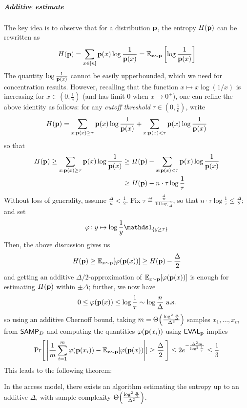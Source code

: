 \subparagraph{Additive estimate}
The key idea is to observe that for a distribution $\mathbf{p}$, the entropy $H(\mathbf{p})$ can be rewritten as
\begin{equation}
  H(\mathbf{p}) = \sum_{x\in[n]} \mathbf{p}(x)\log\frac{1}{\mathbf{p}(x)} = \mathbb{E}_{x\sim \mathbf{p}}\left[ \log\frac{1}{\mathbf{p}(x)} \right]
\end{equation}
The quantity $\log\frac{1}{\mathbf{p}(x)}$ cannot be easily upperbounded, which we need  for concentration results. However, recalling that the function {$x\mapsto x\log(1/x)$} is increasing for $x\in(0,\frac{1}{e})$ (and has limit 0 when $x\to 0^+$), one can refine the above identity as follows: for any \emph{cutoff threshold} $\tau \in(0,\frac{1}{e})$, write 
\begin{equation}
  H(\mathbf{p}) = \sum_{x:\mathbf{p}(x) \geq \tau} \mathbf{p}(x)\log\frac{1}{\mathbf{p}(x)} + \sum_{x:\mathbf{p}(x) < \tau} \mathbf{p}(x)\log\frac{1}{\mathbf{p}(x)} 
\end{equation}
so that
\begin{align*}
  H(\mathbf{p}) \geq \sum_{x:\mathbf{p}(x) \geq \tau} \mathbf{p}(x)\log\frac{1}{\mathbf{p}(x)} &\geq H(\mathbf{p}) - \sum_{x:\mathbf{p}(x) < \tau} \mathbf{p}(x)\log\frac{1}{\mathbf{p}(x)}  \\
  &\geq H(\mathbf{p}) - n\cdot\tau\log\frac{1}{\tau}
\end{align*}
Without loss of generality, assume $\frac{\Delta}{n} < \frac{1}{2}$. Fix $\tau\eqdef\frac{\frac{\Delta}{n}}{10\log \frac{n}{\Delta}}$, so that $n\cdot\tau\log\frac{1}{\tau}\leq \frac{\Delta}{2}$; and set 
\[
  \varphi\colon y \mapsto \log\frac{1}{y}\indic{y \geq \tau}
\]
Then, the above discussion gives us
\begin{equation}
  H(\mathbf{p}) \geq \mathbb{E}_{x\sim \mathbf{p}}[ \varphi(\mathbf{p}(x)) ] \geq H(\mathbf{p}) - \frac{\Delta}{2}
\end{equation}
and getting an additive $\Delta/2$-approximation of $\mathbb{E}_{x\sim \mathbf{p}}[ \varphi(\mathbf{p}(x))]$ is enough for estimating $H(\mathbf{p})$ within $\pm\Delta$; further, we now have
\begin{equation}
  0\leq \varphi(\mathbf{p}(x)) \leq \log\frac{1}{\tau} \sim \log\frac{n}{\Delta} \text{ a.s.}
\end{equation}
so using an additive Chernoff bound, taking $m=\bigTheta{\frac{\log^2\frac{n}{\Delta}}{\Delta^2}}$ samples $x_1,\dots,x_m$ from ${\sf SAMP}_D$ and computing the quantities $\varphi(\mathbf{p}(x_i))$ using ${\sf EVAL}_{\mathbf{p}}$ implies
\[
  \Pr\!\left[\,  \left\lvert   \frac{1}{m}\sum_{i=1}^m\varphi(\mathbf{p}(x_i)) - \mathbb{E}_{x\sim \mathbf{p}}[ \varphi(\mathbf{p}(x))  \right\rvert ]\geq \frac{\Delta}{2} \, \right] \leq 2e^{ -\frac{\Delta^2 m}{\log^2\frac{1}{\tau}} } \leq \frac{1}{3}
\]
\noindent This leads to the following theorem:
\begin{theorem}\label{theorem:entropy:estimation:additive}
In the \pdfsamp access model, there exists an algorithm estimating the entropy up to an additive $\Delta$, with sample complexity $\bigTheta{\frac{\log^2\frac{n}{\Delta}}{\Delta^2}}$.
\end{theorem}
